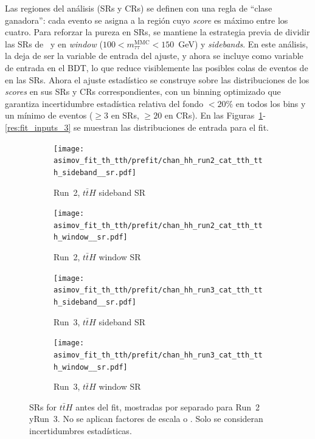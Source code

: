 Las regiones del análisis (SRs y CRs) se definen con una regla de “clase ganadora”: cada evento se asigna a la región cuyo \emph{score} es máximo entre los cuatro. Para reforzar la pureza en SRs, se mantiene la estrategia previa de dividir las SRs de \ttH\ y \thqb en \emph{window} ($100<m^{\text{MMC}}_{\tau\tau}<150$~GeV) y \emph{sidebands}. En este análisis, la \mmc deja de ser la variable de entrada del ajuste, y ahora se incluye como variable de entrada en el BDT, lo que reduce visiblemente las posibles colas de eventos de \ttbar en las SRs. 
Ahora el ajuste estadístico se construye sobre las distribuciones de los \emph{scores} en sus SRs y CRs correspondientes, con un binning optimizado que garantiza incertidumbre estadística relativa del fondo $<20\%$ en todos los bins y un mínimo de eventos ($\ge 3$ en SRs, $\ge 20$ en CRs). En las Figuras~\ref{res:fit_inputs_1}-\ref{res:fit_inputs_3} se muestran las distribuciones de entrada para el fit.

\begin{figure}[htbp]
  \centering
  \begin{subfigure}[t]{0.45\textwidth}
    \centering
    \texttt{[image: asimov\_fit\_th\_tth/prefit/chan\_hh\_run2\_cat\_tth\_tth\_sideband\_\_sr.pdf]}
    \caption{Run~2, $t\bar{t}H$ sideband SR}
  \end{subfigure}
  \hfill
  \begin{subfigure}[t]{0.45\textwidth}
    \centering
    \texttt{[image: asimov\_fit\_th\_tth/prefit/chan\_hh\_run2\_cat\_tth\_tth\_window\_\_sr.pdf]}
    \caption{Run~2, $t\bar{t}H$ window SR}
  \end{subfigure}

  \vspace{0.4cm}
  \begin{subfigure}[t]{0.45\textwidth}
    \centering
    \texttt{[image: asimov\_fit\_th\_tth/prefit/chan\_hh\_run3\_cat\_tth\_tth\_sideband\_\_sr.pdf]}
    \caption{Run~3, $t\bar{t}H$ sideband SR}
  \end{subfigure}
  \hfill
  \begin{subfigure}[t]{0.45\textwidth}
    \centering
    \texttt{[image: asimov\_fit\_th\_tth/prefit/chan\_hh\_run3\_cat\_tth\_tth\_window\_\_sr.pdf]}
    \caption{Run~3, $t\bar{t}H$ window SR}
  \end{subfigure}

  \caption{SRs for $t\bar{t}H$ antes del fit, mostradas por separado para Run~2 yRun~3. No se aplican factores de escala \ztautau o \ttbar. Solo se consideran incertidumbres estadísticas.}
  \label{res:fit_inputs_1}
\end{figure}


